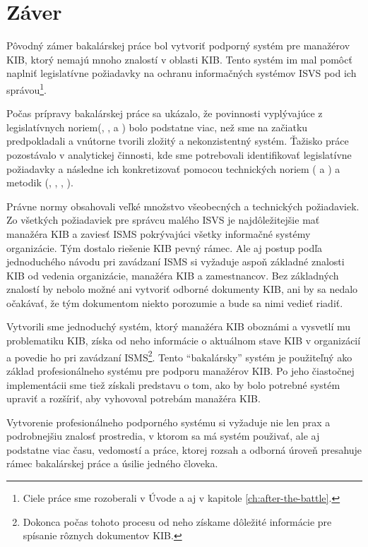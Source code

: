 \chapter*{Záver}  %

Pôvodný zámer bakalárskej práce bol vytvoriť podporný systém pre manažérov KIB, ktorý nemajú mnoho znalostí v oblasti KIB.
Tento systém im mal pomôcť naplniť legislatívne požiadavky na ochranu informačných systémov ISVS pod ich
správou\footnote{Ciele práce sme rozoberali v Úvode a aj v kapitole \ref{ch:after-the-battle}.}.

Počas prípravy bakalárskej práce sa ukázalo, že povinnosti vyplývajúce z legislatívnych noriem(\cite{69/2018},
    \cite{362/2018}, \cite{95/2019} a \cite{179/2020}) bolo podstatne viac, než sme na začiatku predpokladali a vnútorne 
tvorili zložitý a nekonzistentný systém. Ťažisko práce pozostávalo v analytickej činnosti, kde sme potrebovali
identifikovať legislatívne požiadavky a následne ich konkretizovať pomocou technických noriem (\cite{27001} a \cite{27002})
a metodik (\cite{BSI1}, \cite{BSI2}, \cite{BSI3}, \cite{GSK}).

Právne normy obsahovali veľké množstvo všeobecných a technických požiadaviek. Zo všetkých požiadaviek pre správcu
malého ISVS je najdôležitejšie mať manažéra KIB a zaviesť ISMS pokrývajúci všetky informačné systémy organizácie. Tým
dostalo riešenie KIB pevný rámec. Ale aj postup podľa jednoduchého návodu pri zavádzaní ISMS si vyžaduje aspoň základné
znalosti KIB od vedenia organizácie, manažéra KIB a zamestnancov. Bez základných znalostí by nebolo možné ani vytvoriť
odborné dokumenty KIB, ani by sa nedalo očakávať, že tým dokumentom niekto porozumie a bude sa nimi vedieť riadiť.

Vytvorili sme jednoduchý systém, ktorý manažéra KIB oboznámi a vysvetlí mu problematiku KIB, získa od neho informácie o
aktuálnom stave KIB v organizácií a povedie ho pri zavádzaní ISMS\footnote{Dokonca počas tohoto procesu od neho 
získame dôležité informácie pre spísanie rôznych dokumentov KIB.}. Tento \enquote{bakalársky} systém je použiteľný ako
základ profesionálneho systému pre podporu manažérov KIB. Po jeho čiastočnej implementácii sme tiež získali predstavu
o tom, ako by bolo potrebné systém upraviť a rozšíriť, aby vyhovoval potrebám manažéra KIB.

Vytvorenie profesionálneho podporného systému si vyžaduje nie len prax a podrobnejšiu znalosť prostredia, v ktorom sa má
systém použivať, ale aj podstatne viac času, vedomostí a práce, ktorej rozsah a odborná úroveň presahuje rámec
bakalárskej práce a úsilie jedného človeka.



